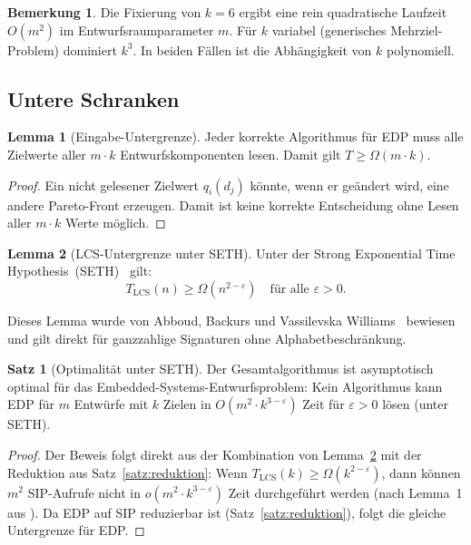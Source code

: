 ﻿\documentclass[a4paper,12pt]{article}
\theoremstyle{definition}
\newtheorem{satz}{Satz}
\newtheorem{lemma}{Lemma}
\newtheorem{bemerkung}{Bemerkung}
\begin{document}
\begin{bemerkung}
    Die Fixierung von $k = 6$ ergibt eine rein quadratische Laufzeit
    $O(m^2)$ im Entwurfsraumparameter $m$. F\"{u}r $k$ variabel (generisches
    Mehr\-ziel-Problem) dominiert $k^3$. In beiden F\"{a}llen ist die Abh\"{a}ngigkeit
    von $k$ polynomiell.
\end{bemerkung}

\subsection{Untere Schranken}

\begin{lemma}[Eingabe-Untergrenze]\label{lem:eingabe_es}
    Jeder korrekte Algorithmus f\"{u}r EDP muss alle Zielwerte aller
    $m \cdot k$ Entwurfskomponenten lesen.
    Damit gilt $T \geq \Omega(m \cdot k)$.
\end{lemma}

\begin{proof}
    Ein nicht gelesener Zielwert $q_i(d_j)$ k\"{o}nnte, wenn er ge\"{a}ndert wird,
    eine andere Pareto-Front erzeugen. Damit ist keine korrekte Entscheidung
    ohne Lesen aller $m \cdot k$ Werte m\"{o}glich.
\end{proof}

\begin{lemma}[LCS-Untergrenze unter SETH]\label{lem:lcs_es}
    Unter der Strong Exponential Time Hypothesis~(SETH)~\cite{impagliazzo2001complexity}
    gilt:
    \[
        T_{\mathrm{LCS}}(n) \geq \Omega(n^{2-\varepsilon})
        \quad \text{f\"{u}r alle } \varepsilon > 0.
    \]
\end{lemma}

Dieses Lemma wurde von Abboud, Backurs und Vassilevska Williams~\cite{abboud2015tight}
bewiesen und gilt direkt f\"{u}r ganzzahlige Signaturen ohne Alphabetbeschr\"{a}nkung.

\begin{satz}[Optimalit\"{a}t unter SETH]
    Der Gesamtalgorithmus ist asymptotisch optimal f\"{u}r das
    Embedded-Systems-Entwurfsproblem: Kein Algorithmus kann EDP f\"{u}r $m$
    Entw\"{u}rfe mit $k$ Zielen in $O(m^2 \cdot k^{3-\varepsilon})$ Zeit f\"{u}r
    $\varepsilon > 0$ l\"{o}sen (unter SETH).
\end{satz}

\begin{proof}
    Der Beweis folgt direkt aus der Kombination von Lemma~\ref{lem:lcs_es}
    mit der Reduktion aus Satz~\ref{satz:reduktion}:
    Wenn $T_\mathrm{LCS}(k) \geq \Omega(k^{2-\varepsilon})$,
    dann k\"{o}nnen $m^2$ SIP-Aufrufe nicht in $o(m^2 \cdot k^{3-\varepsilon})$
    Zeit durchgef\"{u}hrt werden (nach Lemma~1 aus \cite{epp2026subgraph}).
    Da EDP auf SIP reduzierbar ist (Satz~\ref{satz:reduktion}), folgt
    die gleiche Untergrenze f\"{u}r EDP.
\end{proof}
\end{document}

